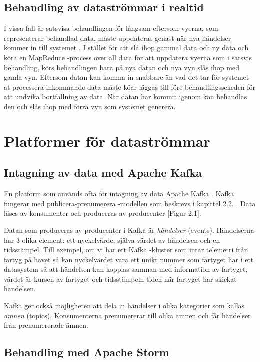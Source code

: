 \section{Behandling av dataströmmar i realtid}

I vissa fall är satsvisa behandlingen för långsam eftersom vyerna, som representerar behandlad data, måste uppdateras genast när
nya händelser kommer in till systemet \citep{marz2013big}. I stället för att slå ihop gammal
data och ny data och köra en MapReduce -process över all data för att uppdatera vyerna som i 
satsvis behandling, körs behandlingen bara på nya datan och nya vyn slås ihop med gamla vyn.
Eftersom datan kan komma in snabbare än vad det tar för systemet at processera inkommande data
måste köar läggas till före behandlingssekeden för att undvika bortfallning av data. När datan
har kommit igenom kön behandlas den och slås ihop med förra vyn som systemet generera.

\chapter{Platformer för dataströmmar}

\section{Intagning av data med Apache Kafka}

En platform som används ofta för intagning av data Apache Kafka \citep{marz2013big}. Kafka fungerar med publicera-prenumerera -modellen
som beskrevs i kapittel 2.2. \citep{kafka}. Data läses av konsumenter och produceras av producenter [Figur 2.1].

Datan som produceras av producenter i Kafka är \textit{händelser} (events). Händelserna har 3 olika
element: ett nyckelvärde, själva värdet av händelsen och en tidsstämpel. Till exempel, om vi har ett Kafka -kluster som intar telemetri från fartyg på havet så kan nyckelvärdet vara ett unikt nummer som fartyget har i ett datasystem så att händelsen kan kopplas samman med information av fartyget, värdet är kursen av fartyget och tidsstämpeln tiden när fartyget har skickat händelsen.

Kafka ger också möjligheten att dela in händelser i olika kategorier som kallas \textit{ämnen} (topics). Konsumenterna prenumererar till olika ämnen och får händelser från prenumererade ämnen.

\section{Behandling med Apache Storm}

